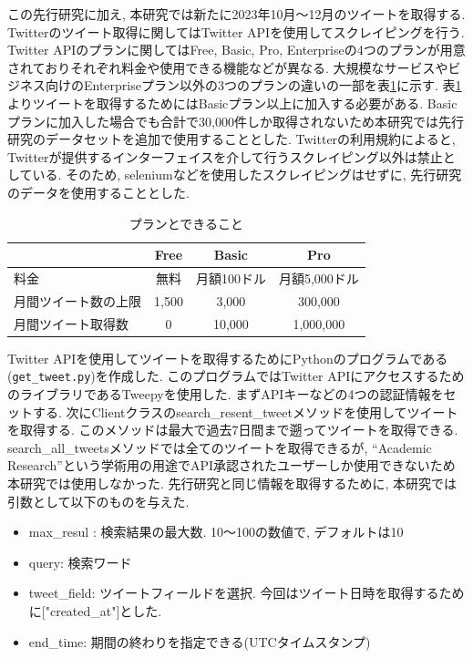 この先行研究に加え, 本研究では新たに2023年10月〜12月のツイートを取得する. Twitterのツイート取得に関してはTwitter APIを使用してスクレイピングを行う. Twitter APIのプランに関してはFree, Basic, Pro, Enterpriseの4つのプランが用意されておりそれぞれ料金や使用できる機能などが異なる. 大規模なサービスやビジネス向けのEnterpriseプラン以外の3つのプランの違いの一部を表\ref{tb:xplan}に示す. 
表\ref{tb:xplan}よりツイートを取得するためにはBasicプラン以上に加入する必要がある. Basicプランに加入した場合でも合計で30,000件しか取得されないため本研究では先行研究のデータセットを追加で使用することとした. Twitterの利用規約によると, Twitterが提供するインターフェイスを介して行うスクレイピング以外は禁止としている. そのため, seleniumなどを使用したスクレイピングはせずに, 先行研究のデータを使用することとした. 

\begin{table}[htbp]
  \caption{プランとできること}
  \label{tb:xplan}
  \begin{center}
  \begin{tabular}{|l|c|c|c|}
    \hline
    &Free&Basic&Pro \\\hline\hline
    料金&無料&月額100ドル&月額5,000ドル \\\hline
    月間ツイート数の上限&1,500&3,000&300,000 \\\hline
    月間ツイート取得数&0&10,000&1,000,000 \\\hline
  \end{tabular}\end{center}
\end{table}

Twitter APIを使用してツイートを取得するためにPythonのプログラムである(\verb|get_tweet.py|)を作成した. このプログラムではTwitter APIにアクセスするためのライブラリであるTweepy\cite{tweepy}を使用した. まずAPIキーなどの4つの認証情報をセットする. 次にClientクラスのsearch\_resent\_tweetメソッドを使用してツイートを取得する. 
このメソッドは最大で過去7日間まで遡ってツイートを取得できる. search\_all\_tweetsメソッドでは全てのツイートを取得できるが, ``Academic Research''という学術用の用途でAPI承認されたユーザーしか使用できないため本研究では使用しなかった. 
先行研究と同じ情報を取得するために, 本研究では引数として以下のものを与えた. 
\begin{itemize}
 \item max\_resul : 検索結果の最大数. 10〜100の数値で, デフォルトは10
 \item query: 検索ワード
 \item tweet\_field: ツイートフィールドを選択. 今回はツイート日時を取得するために["created\_at"]とした. 
 \item end\_time: 期間の終わりを指定できる(UTCタイムスタンプ)
\end{itemize}

